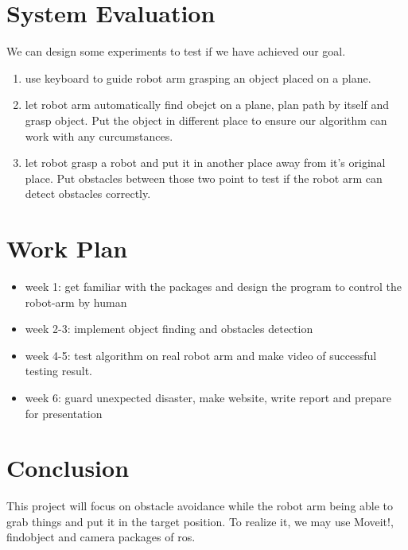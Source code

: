 \documentclass[paper=a4, fontsize=11pt]{scrartcl} %
\numberwithin{equation}{section} %
\numberwithin{figure}{section} %
\numberwithin{table}{section} %
\begin{document}
\section{System	Evaluation}

We can design some experiments to test if we have achieved our goal.

\begin{enumerate}
\item use keyboard to guide robot arm grasping an object placed on a plane.
\item let robot arm automatically find obejct on a plane, plan path by itself and grasp object. Put the object in different place to ensure our algorithm can work with any curcumstances.
\item let robot grasp a robot and put it in another place away from it's original place. Put obstacles between those two point to test if the robot arm can detect obstacles correctly.
\end{enumerate}

\section{Work Plan}

\begin{itemize}
\item week 1: get familiar with the packages and design the program to control the robot-arm by human
\item week 2-3: implement object finding and obstacles detection 
\item week 4-5: test algorithm on real robot arm and make video of successful testing result. 
\item week 6: guard unexpected disaster, make website, write report and prepare for presentation
\end{itemize}

\section{Conclusion}

This project will focus on obstacle avoidance while the robot arm being able to grab things and put it in the target position. To realize it, we may use Moveit!, findobject and camera packages of ros.
\end{document}

